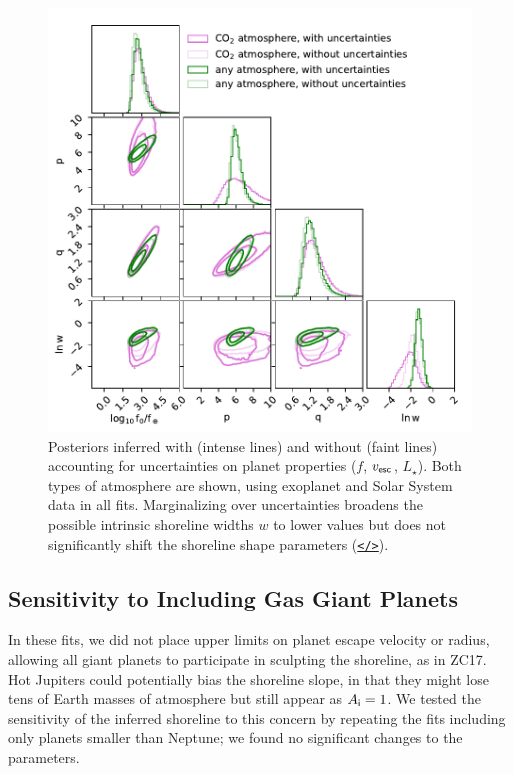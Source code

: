 \documentclass[modern,linenumbers,trackchanges]{aastex7}
\begin{document}
\begin{figure}[ht!]
\includegraphics[width=\textwidth]{figures/posteriors-with-and-without-uncertainties.pdf}
\caption{Posteriors inferred with (intense lines) and without (faint lines) accounting for uncertainties on planet properties ($f$, $v_{\sf esc}$, $L_\star$). Both types of atmosphere are shown, using exoplanet and Solar System data in all fits. Marginalizing over uncertainties broadens the possible intrinsic shoreline widths $w$ to lower values but does not significantly shift the shoreline shape parameters (\href{https://github.com/zkbt/shoreline/blob/main/notebooks/print-and-visualize-posteriors.ipynb}{\texttt{</>}}).}
\label{f:posteriors-uncertainties}
\end{figure}








\subsection{Sensitivity to Including Gas Giant Planets}
In these fits, we did not place upper limits on planet escape velocity or radius, allowing all giant planets to participate in sculpting the shoreline, as in ZC17. Hot Jupiters could potentially bias the shoreline slope, in that they might lose tens of Earth masses of atmosphere but still appear as $A_{\sf i} = 1$. We tested the sensitivity of the inferred shoreline to this concern by repeating the fits including only planets smaller than Neptune; we found no significant changes to the parameters. 
\end{document}
